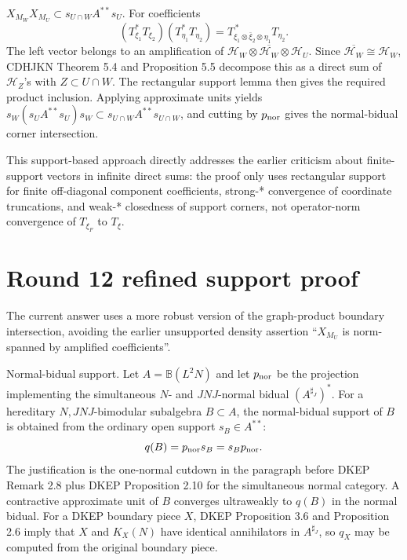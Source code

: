 \documentclass{article}
\begin{document}
\begin{itemize}
\(X_{M_W}X_{M_U}\subset s_{U\cap W}A^{**}s_U\).  For coefficients
\[
 (T_{\xi_1}^*T_{\xi_2})(T_{\eta_1}^*T_{\eta_2})
 =
 T_{\xi_1\otimes\bar\xi_2\otimes\eta_1}^{\,*}T_{\eta_2}.
\]
The left vector belongs to an amplification of
\(\mathcal H_W\otimes\overline{\mathcal H_W}\otimes\mathcal H_U\).  Since
\(\overline{\mathcal H_W}\cong\mathcal H_W\), CDHJKN Theorem 5.4 and
Proposition 5.5 decompose this as a direct sum of \(\mathcal H_Z\)'s with
\(Z\subset U\cap W\).  The rectangular support lemma then gives the required
product inclusion.  Applying approximate units yields
\(s_W(s_UA^{**}s_U)s_W\subset s_{U\cap W}A^{**}s_{U\cap W}\), and cutting by
\(p_{\rm nor}\) gives the normal-bidual corner intersection.
\end{itemize}

This support-based approach directly addresses the earlier criticism about
finite-support vectors in infinite direct sums: the proof only uses rectangular support for finite off-diagonal component coefficients, strong-*
convergence of coordinate truncations, and weak-* closedness of support corners,
not operator-norm convergence of \(T_{\xi_F}\) to \(T_\xi\).


\section*{Round 12 refined support proof}

The current answer uses a more robust version of the graph-product boundary
intersection, avoiding the earlier unsupported density assertion
``\(X_{M_U}\) is norm-spanned by amplified coefficients''.

Normal-bidual support.  Let \(A=\mathbb B(L^2N)\) and let \(p_{\rm nor}\) be
the projection implementing the simultaneous \(N\)- and \(JNJ\)-normal bidual
\((A^{\sharp_J})^*\).  For a hereditary \(N,JNJ\)-bimodular subalgebra
\(B\subset A\), the normal-bidual support of \(B\) is obtained from the ordinary
open support \(s_B\in A^{**}\):
\[
        q(B)=p_{\rm nor}s_B=s_Bp_{\rm nor}.
\]
The justification is the one-normal cutdown in the paragraph before DKEP
Remark 2.8 plus DKEP Proposition 2.10 for the simultaneous normal category.  A
contractive approximate unit of \(B\) converges ultraweakly to \(q(B)\) in the
normal bidual.  For a DKEP boundary piece \(X\), DKEP Proposition 3.6 and
Proposition 2.6 imply that \(X\) and \(K_X(N)\) have identical annihilators in
\(A^{\sharp_J}\), so \(q_X\) may be computed from the original boundary piece.
\end{document}
